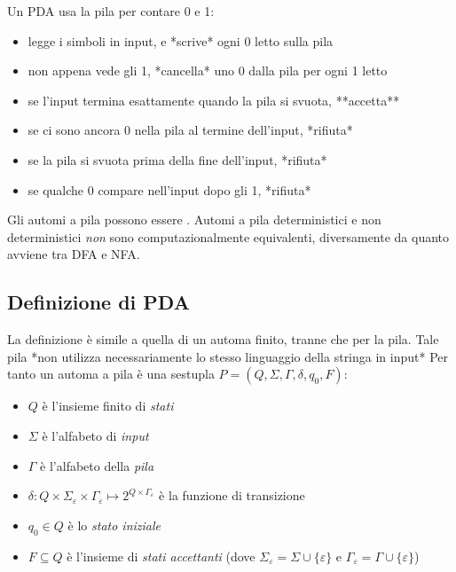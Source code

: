 Un PDA usa la pila per contare 0 e 1:
\begin{itemize}
	\item legge i simboli in input, e *scrive* ogni 0 letto sulla pila
	\item non appena vede gli 1, *cancella* uno 0 dalla pila per ogni 1 letto
	\item se l’input termina esattamente quando la pila si svuota, **accetta**
	\item se ci sono ancora 0 nella pila al termine dell’input, *rifiuta*
	\item se la pila si svuota prima della fine dell’input, *rifiuta*
	\item se qualche 0 compare nell’input dopo gli 1, *rifiuta*
\end{itemize}


\begin{center}
	\Large{}
\end{center}

Gli automi a pila possono essere .
Automi a pila deterministici e non deterministici \textit{non} sono computazionalmente equivalenti, diversamente da quanto avviene tra DFA e NFA. 

\subsection{Definizione di PDA}
La definizione è simile a quella di un automa finito, tranne che per la pila. 
Tale pila *non utilizza necessariamente lo stesso linguaggio della stringa in input*
Per tanto un automa a pila è una sestupla $P=(Q,\Sigma,\Gamma,\delta, q_0, F)$:
\begin{itemize}
	\item $Q$ è l'insieme finito di \textit{stati}
	\item $\Sigma$ è l'alfabeto di \textit{input}
	\item $\Gamma$ è l'alfabeto della \textit{pila}
	\item $\delta:Q\times\Sigma_\varepsilon \times\Gamma_\varepsilon\mapsto 2^{Q\times\Gamma_\varepsilon}$ è la funzione di transizione
	\item $q_0\in Q$ è lo \textit{stato iniziale}
	\item $F\subseteq Q$ è l'insieme di \textit{stati accettanti} (dove $\Sigma_\varepsilon = \Sigma\cup\{\varepsilon\}$ e $\Gamma_\varepsilon = \Gamma\cup \{\varepsilon\}$)
\end{itemize}

